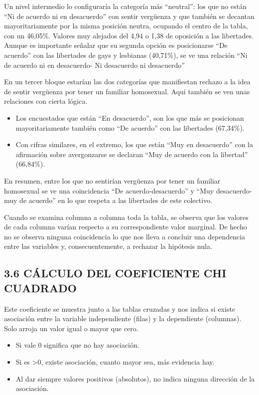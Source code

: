 \documentclass[
  12 pt,
  a4paper,
]{article}
\providecommand{\tightlist}{%
  \setlength{\itemsep}{0pt}\setlength{\parskip}{0pt}}
\begin{document}
Un nivel intermedio lo configuraría la categoría más ``neutral'': los
que no están ``Ni de acuerdo ni en desacuerdo'' con sentir vergüenza y
que también se decantan mayoritariamente por la misma posición neutra,
ocupando el centro de la tabla, con un 46,05\%. Valores muy alejados del
4,94 o 1,38 de oposición a las libertades. Aunque es importante señalar
que su segunda opción es posicionarse ``De acuerdo'' con las libertades
de gays y lesbianas (40,71\%), se ve una relación ``Ni de acuerdo ni en
desacuerdo- Ni desacuerdo ni desacuerdo''

En un tercer bloque estarían las dos categorías que manifiestan rechazo
a la idea de sentir vergüenza por tener un familiar homosexual. Aquí
también se ven unas relaciones con cierta lógica.

\begin{itemize}
\item
  Los encuestados que están ``En desacuerdo'', son los que más se
  posicionan mayoritariamente también como ``De acuerdo'' con las
  libertades (67,34\%).
\item
  Con cifras similares, en el extremo, los que están ``Muy en
  desacuerdo'' con la afirmación sobre avergonzarse se declaran ``Muy de
  acuerdo con la libertad'' (66,84\%).
\end{itemize}

En resumen, entre los que no sentirían vergüenza por tener un familiar
homosexual se ve una coincidencia ``De acuerdo-desacuerdo'' y ``Muy
desacuerdo-muy de acuerdo'' en lo que respeta a las libertades de este
colectivo.

Cuando se examina columna a columna toda la tabla, se observa que los
valores de cada columna varían respecto a su correspondiente valor
marginal. De hecho no se observa ninguna coincidencia lo que nos lleva a
concluir una dependencia entre las variables y, consecuentemente, a
rechazar la hipótesis nula.

\newpage

\subsection{3.6 CÁLCULO DEL COEFICIENTE CHI
CUADRADO}\label{cuxe1lculo-del-coeficiente-chi-cuadrado}

Este coeficiente se muestra junto a las tablas cruzadas y nos indica si
existe asociación entre la variable independiente (filas) y la
dependiente (columnas). Solo arroja un valor igual o mayor que cero.

\begin{itemize}
\tightlist
\item
  Si vale 0 significa que no hay asociación.
\item
  Si es \textgreater0, existe asociación, cuanto mayor sea, más
  evidencia hay.
\item
  Al dar siempre valores positivos (absolutos), no indica ninguna
  dirección de la asociación.
\end{itemize}
\end{document}
